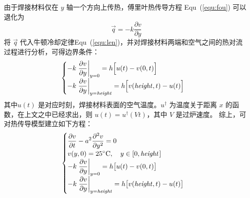 \documentclass[../main.tex]{subfiles}
\begin{document}
由于焊接材料仅在 \(y\) 轴一个方向上传热，傅里叶热传导方程 Equ~(\ref{equ:fou}) 可以退化为
\begin{equation}
\vec q = {-} k \frac{\partial v}{ \partial y}
\end{equation}
将 \(\vec q\) 代入牛顿冷却定律Equ~(\ref{equ:len})，并对焊接材料两端和空气之间的热对流过程进行分析，可得边界条件：
\begin{equation}\label{equ:bian}
\begin{cases}
\displaystyle- k \left.\frac{\partial v}{\partial y}\right|_{y = 0} =  h \Big[ u(t) - v(0, t)\Big] \\
\displaystyle- k \left.\frac{\partial v}{\partial y}\right|_{y = {\it height}} = h \Big[v({\it height}, t) - u(t)\Big]
\end{cases}
\end{equation}
其中\(u(t)\) 是对应时刻，焊接材料表面的空气温度。\(u ^{\dagger}\) 为温度关于距离 \(x\) 的函数，在上文之中已经求出，则 \(u (t) = u^{\dagger} ( Vt)\)，其中 \(V\) 是过炉速度。
综上，可对热传导模型建立如下方程：
\begin{equation}
\begin{cases}
\displaystyle \frac{\partial v}{\partial t} - a ^{2}  \frac{\partial ^{2} v}{\partial y^{2}} = 0 \\
\displaystyle v (y , 0) = 25 ^{\circ}\mathrm{C}, \quad y \in [0, {\it height\kern 1pt}] \\
\displaystyle- k \left.\frac{\partial v}{\partial y}\right|_{y = 0} =  h \big[u(t) - v(0, t)\big] \\
\displaystyle- k \left.\frac{\partial v}{\partial y}\right|_{y = {\it height}} = h \big[v({\it height}, t) - u(t)\big]
\end{cases}
\end{equation}
\end{document}
